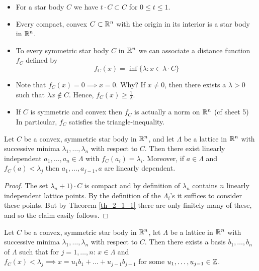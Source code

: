\documentclass[NumTh.tex]{subfiles}
\begin{document}
\begin{rem}
  \begin{itemize}
    \item For a star body $C$ we have $t \cdot C \subset C$ for $0 \leq t \leq 1$.
    \item Every compact, convex $C \subset \mathbb{R}^n$ with the origin in its interior is a star body in $\mathbb{R}^n$.
    \item To every symmetric star body $C$ in $\mathbb{R}^n$ we can associate a distance function $f_C$ defined by
    \[ f_C(x) = \inf \{ \lambda: x \in \lambda \cdot C \} \]
    \item Note that $f_C(x) = 0 \implies x =0$. Why?
    If $x \neq 0$, then there exists a $\lambda > 0$ such that $\lambda x \nin C$.
    Hence, $f_C(x) \geq \frac{1}{\lambda}$.
    \item If $C$ is symmetric and convex then $f_C$ is actually a norm on $\mathbb{R}^n$ (cf sheet 5)
    In particular, $f_C$ satisfies the triangle-inequality.
  \end{itemize}
\end{rem}

\begin{lemma}[2.3.3\label{l_2_3_3}]
  Let $C$ be a convex, symmetric star body in $\mathbb{R}^n$, and let $\Lambda$ be a lattice in $\mathbb{R}^n$ with successive minima $\lambda_1,\dots,\lambda_n$ with respect to $C$.
  Then there exist linearly independent $a_1,\dots,a_n \in \Lambda$ with $f_C(a_i) =  \lambda_i$.
  Moreover, if $a \in \Lambda$ and $f_C(a) < \lambda_j$ then $a_1,\dots,a_{j-1},a$ are linearly dependent.
\end{lemma}

\begin{proof}
  The set $\lambda_n +1) \cdot C$ is compact and by definition of $\lambda_n$ contains $n$ linearly independent lattice points.
  By the definition of the $\Lambda_i$'s it suffices to consider these points.
  But by Theorem \ref{th_2_1_1} there are only finitely many of these, and so the claim easily follows.
\end{proof}

\begin{cor}
  Let $C$ be a convex, symmetric star body in $\mathbb{R}^n$, let $\Lambda$ be a lattice in $\mathbb{R}^n$ with successive minima $\lambda_1,\dots,\lambda_n$ with respect to $C$.
  Then there exists a basis $b_1,\dots,b_n$ of $\Lambda$ such that for $j = 1,\dots,n$: 
  $x \in \Lambda$ and $f_C(x) < \lambda_j \implies x = u_1 b_1 + \dots + u_{j-1} b_{j-1}$ for some $u_1,\dots,u_{j-1} \in \mathbb{Z}$.
\end{cor}
\end{document}
